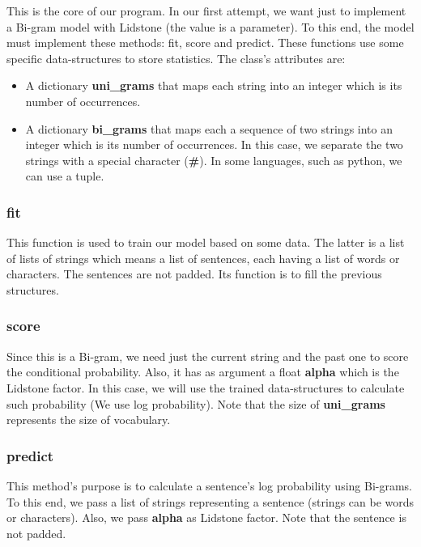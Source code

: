 \documentclass[11pt, a4paper]{article}
\begin{document}
This is the core of our program.
In our first attempt, we want just to implement a Bi-gram model with Lidstone (the value is a parameter).
To this end, the model must implement these methods: fit, score and predict.
These functions use some specific data-structures to store statistics.
The class's attributes are:
\begin{itemize}
	\item A dictionary \textbf{uni\_grams} that maps each string into an integer which is its number of occurrences.
	\item A dictionary \textbf{bi\_grams} that maps each a sequence of two strings into an integer which is its number of occurrences.
	In this case, we separate the two strings with a special character (\textbf{\#}).
	In some languages, such as python, we can use a tuple.
\end{itemize}

\subsubsection*{fit}

This function is used to train our model based on some data.
The latter is a list of lists of strings which means a list of sentences, each having a list of words or characters.
The sentences are not padded.
Its function is to fill the previous structures.

\subsubsection*{score}

Since this is a Bi-gram, we need just the current string and the past one to score the conditional probability. 
Also, it has as argument a float \textbf{alpha} which is the Lidstone factor.
In this case, we will use the trained data-structures to calculate such probability (We use log probability).
Note that the size of \textbf{uni\_grams} represents the size of vocabulary.

\subsubsection*{predict}

This method's purpose is to calculate a sentence's log probability using Bi-grams.
To this end, we pass a list of strings representing a sentence (strings can be words or characters).
Also, we pass \textbf{alpha} as Lidstone factor.
Note that the sentence is not padded.
\end{document}
